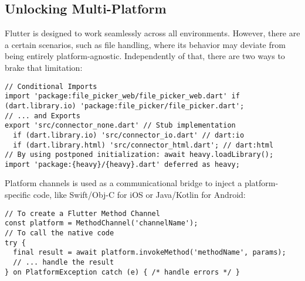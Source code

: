 
\newpage
\subsection{Unlocking Multi-Platform}

Flutter is designed to work seamlessly across all environments. However, there are a certain scenarios, such as file
handling, where its behavior may deviate from being entirely platform-agnostic. Independently of that, there are two
ways to brake that limitation:

\begin{lstlisting}
// Conditional Imports
import 'package:file_picker_web/file_picker_web.dart' if (dart.library.io) 'package:file_picker/file_picker.dart';
// ... and Exports
export 'src/connector_none.dart' // Stub implementation
  if (dart.library.io) 'src/connector_io.dart' // dart:io
  if (dart.library.html) 'src/connector_html.dart'; // dart:html
// By using postponed initialization: await heavy.loadLibrary();
import 'package:{heavy}/{heavy}.dart' deferred as heavy;
\end{lstlisting}

\noindent Platform channels is used as a communicational bridge to inject a platform-specific code, like Swift/Obj-C 
for iOS or Java/Kotlin for Android:

\begin{lstlisting}
// To create a Flutter Method Channel
const platform = MethodChannel('channelName');
// To call the native code
try {
  final result = await platform.invokeMethod('methodName', params);
  // ... handle the result
} on PlatformException catch (e) { /* handle errors */ }
\end{lstlisting}